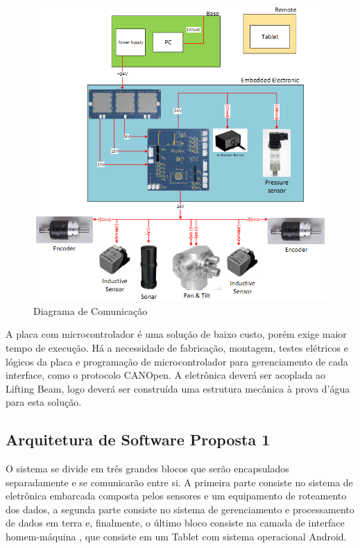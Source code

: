 \begin{figure}[H]
    \centering
    \includegraphics[width=1\columnwidth]{figs/eletronica/3.png}
    \caption{Diagrama de Comunicação}
    \label{com_placa}
\end{figure}
 
A placa com microcontrolador é uma solução de baixo custo, porém exige maior tempo de execução. Há a necessidade de fabricação, montagem, testes elétricos e lógicos da placa e programação de microcontrolador para gerenciamento de cada interface, como o protocolo CANOpen. 
A eletrônica deverá ser acoplada ao Lifting Beam, logo deverá ser construída uma estrutura mecânica à prova d’água para esta solução.

\subsection{Arquitetura de Software Proposta 1}
O sistema se divide em três grandes blocos que serão encapsulados separadamente
e se comunicarão entre si. A primeira parte consiste no sistema de eletrônica
embarcada composta pelos sensores e um equipamento de roteamento dos dados, a
segunda parte consiste no sistema de gerenciamento e processamento de dados em
terra e, finalmente, o último bloco consiste na camada de interface
homem-máquina , que consiste em um Tablet com sistema operacional Android.

